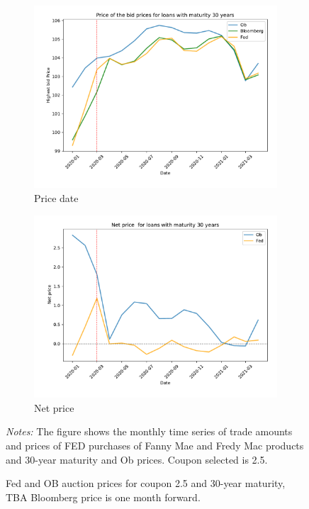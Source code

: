 \documentclass[11pt,a4paper]{article}
\begin{document}
\begin{figure}[h]
    \centering
    \begin{subfigure}[b]{0.49\textwidth}
      \includegraphics[width=0.998\textwidth]{../results/figures/fed_price_mean_mat30_loan1_timeseries_nrmonthly_2.5_4__fed_ob}
      \caption{Price date}
     \end{subfigure}
     \begin{subfigure}[b]{0.49\textwidth}
      \includegraphics[width=0.998\textwidth]{../results/figures/fed_price_mean_mat30_loan1_timeseries_nrmonthly__normalized_fed_ob}
      \caption{Net price}
     \end{subfigure}
     \caption{Fed and OB auction prices for coupon 2.5 and 30-year maturity, TBA Bloomberg price is one month forward. } 
     \begin{minipage}{\textwidth}
      \footnotesize{\textit{Notes:} The figure shows the monthly time series of trade amounts and prices of FED  purchases of Fanny Mae and Fredy Mac products and 30-year maturity and Ob prices. Coupon selected is 2.5. } 
        \end{minipage}
\end{figure}
\end{document}
